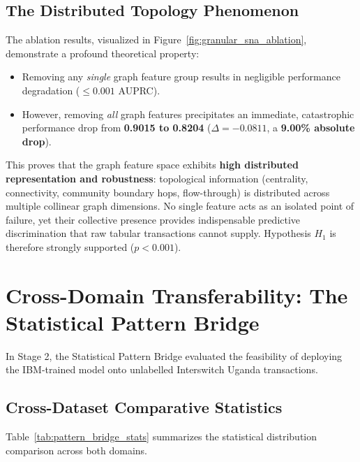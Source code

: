 \subsection{The Distributed Topology Phenomenon}
The ablation results, visualized in Figure~\ref{fig:granular_sna_ablation}, demonstrate a profound theoretical property:
\begin{itemize}
    \item Removing any \textit{single} graph feature group results in negligible performance degradation ($\le 0.001$ AUPRC).
    \item However, removing \textit{all} graph features precipitates an immediate, catastrophic performance drop from \textbf{0.9015 to 0.8204} ($\Delta = -0.0811$, a \textbf{9.00\% absolute drop}).
\end{itemize}
This proves that the graph feature space exhibits \textbf{high distributed representation and robustness}: topological information (centrality, connectivity, community boundary hops, flow-through) is distributed across multiple collinear graph dimensions. No single feature acts as an isolated point of failure, yet their collective presence provides indispensable predictive discrimination that raw tabular transactions cannot supply. Hypothesis $H_1$ is therefore strongly supported ($p < 0.001$).

\section{Cross-Domain Transferability: The Statistical Pattern Bridge}
In Stage 2, the Statistical Pattern Bridge evaluated the feasibility of deploying the IBM-trained model onto unlabelled Interswitch Uganda transactions.

\subsection{Cross-Dataset Comparative Statistics}
Table~\ref{tab:pattern_bridge_stats} summarizes the statistical distribution comparison across both domains.

